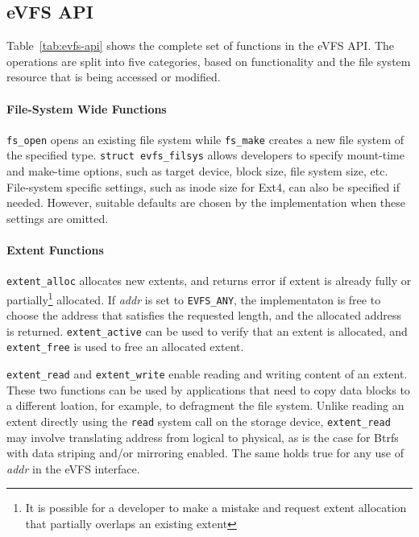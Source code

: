 \subsection{eVFS API\label{subsec:evfs}}

Table~\ref{tab:evfs-api} shows the complete set of functions in the eVFS API. The operations are split into five categories, based on functionality and the file system resource that is being accessed or modified. 

\paragraph{File-System Wide Functions} \texttt{fs\_open} opens an existing file system while \texttt{fs\_make} creates a new file system of the specified type. \texttt{struct evfs\_filsys} allows developers to specify mount-time and make-time options, such as target device, block size, file system size, etc. File-system specific settings, such as inode size for Ext4, can also be specified if needed. However, suitable defaults are chosen by the implementation when these settings are omitted.

\paragraph{Extent Functions} \texttt{extent\_alloc} allocates new extents, and returns error if extent is already fully or partially\footnote{It is possible for a developer to make a mistake and request extent allocation that partially overlaps an existing extent} allocated. If \textit{addr} is set to \texttt{EVFS\_ANY}, the implementaton is free to choose the address that satisfies the requested length, and the allocated address is returned. \texttt{extent\_active} can be used to verify that an extent is allocated, and \texttt{extent\_free} is used to free an allocated extent.

\texttt{extent\_read} and \texttt{extent\_write} enable reading and writing content of an extent. These two functions can be used by applications that need to copy data blocks to a different loation, for example, to defragment the file system. Unlike reading an extent directly using the \texttt{read} system call on the storage device, \texttt{extent\_read} may involve translating address from logical to physical, as is the case for Btrfs with data striping and/or mirroring enabled. The same holds true for any use of \textit{addr} in the eVFS interface.

